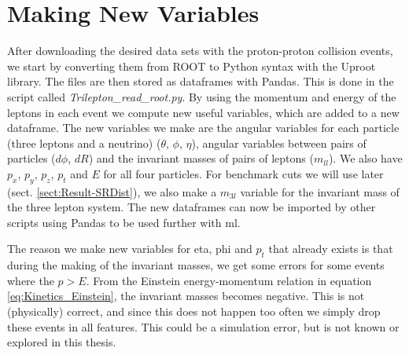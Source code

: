 \documentclass[a4paper, american, 12pt]{report}
\begin{document}
	\section{Making New Variables}
	\label{sect:Method-MakingVariables}
	After downloading the desired data sets with the proton-proton collision events, we start by converting them from ROOT to Python syntax with the Uproot library. The files are then stored as dataframes with Pandas. This is done in the script called \textit{Trilepton\_read\_root.py}. By using the momentum and energy of the leptons in each event we compute new useful variables, which are added to a new dataframe. The new variables we make are the angular variables for each particle (three leptons and a neutrino) ($\theta$, $\phi$, $\eta$), angular variables between pairs of particles ($d\phi$, $dR$) and the invariant masses of pairs of leptons ($m_{ll}$). We also have $p_x$, $p_y$, $p_z$, $p_t$ and $E$ for all four particles. For benchmark cuts we will use later (sect. \ref{sect:Result-SRDist}), we also make a $m_{3l}$ variable for the invariant mass of the three lepton system. The new dataframes can now be imported by other scripts using Pandas to be used further with \acrshort{ml}. 
	
	The reason we make new variables for eta, phi and $p_t$ that already exists is that during the making of the invariant masses, we get some errors for some events where the $p>E$. From the Einstein energy-momentum relation in equation \ref{eq:Kinetics_Einstein}, the invariant masses becomes negative. This is not (physically) correct, and since this does not happen too often we simply drop these events in all features. This could be a simulation error, but is not known or explored in this thesis.
	
\end{document}

